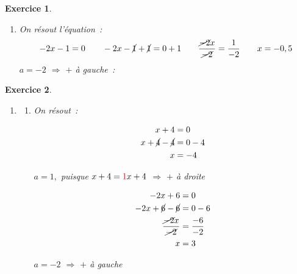 \documentclass[10pt]{article}
\newtheorem{exo}{Exercice}
\begin{document}
\begin{exo}
\begin{enumerate}
\item On résout l'équation~:
\[-2x-1=0\qquad -2x-\cancel{1}+\cancel{1}=0+1\qquad \frac{\cancel{-2}x}{\cancel{-2}}=\frac{1}{-2}\qquad x=-0,5\]
$a=-2$ $\Rightarrow$ $+$ à gauche~:

\medskip
\begin{center}
\end{center}
\end{enumerate}
\end{exo}

\begin{exo}

\begin{enumerate}
\item %
\begin{enumerate}
\item \setlength{\columnseprule}{1pt}

\begin{multicols}{2}

On résout~:

\begin{align*}
x+4&=0\\
x+\cancel{4}-\cancel{4}&=0-4\\
x&=-4
\end{align*}

$a=1,$ puisque $x+4=\textcolor{red}{1}x+4$ $\Rightarrow$ $+$ à droite

\columnbreak

\begin{align*}
-2x+6&=0\\
-2x+\cancel{6}-\cancel{6}&=0-6\\
 \frac{\cancel{-2}x}{\cancel{-2}}&=\frac{-6}{-2}\\
 x&=3
 \end{align*}
 
 $a=-2$ $\Rightarrow$ $+$ à gauche

\end{multicols}

\begin{center}
\end{center}



\end{enumerate}
\end{enumerate}
\end{exo}
\end{document}
